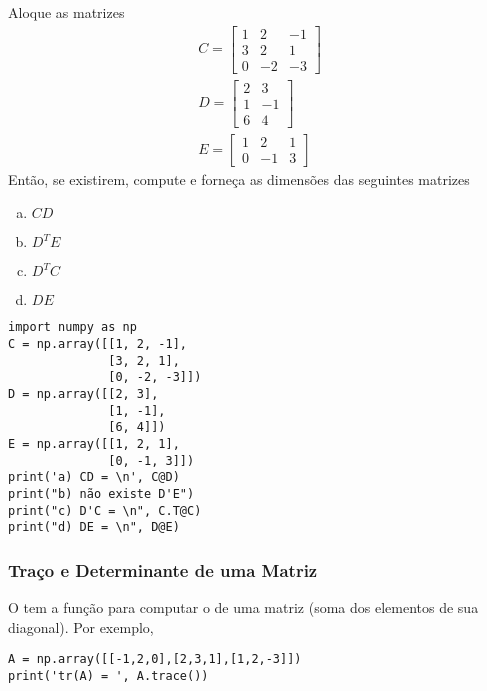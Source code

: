 \begin{exer}
  Aloque as matrizes
  \begin{gather}
    C =
    \begin{bmatrix}
      1 & 2 & -1 \\
      3 & 2 & 1 \\
      0 & -2 & -3
    \end{bmatrix}\\
    D =
    \begin{bmatrix}
      2 & 3 \\
      1 & -1 \\
      6 & 4
    \end{bmatrix}\\
    E =
    \begin{bmatrix}
      1 & 2 & 1 \\
      0 & -1 & 3
    \end{bmatrix}
  \end{gather}
  Então, se existirem, compute e forneça as dimensões das seguintes matrizes
  \begin{enumerate}[a)]
  \item $CD$
  \item $D^TE$
  \item $D^TC$
  \item $DE$
  \end{enumerate}
\end{exer}
\begin{resp}
  
\begin{lstlisting}
import numpy as np
C = np.array([[1, 2, -1],
              [3, 2, 1],
              [0, -2, -3]])
D = np.array([[2, 3],
              [1, -1],
              [6, 4]])
E = np.array([[1, 2, 1],
              [0, -1, 3]])
print('a) CD = \n', C@D)
print("b) não existe D'E")
print("c) D'C = \n", C.T@C)
print("d) DE = \n", D@E)
\end{lstlisting}

\end{resp}

\subsubsection{Traço e Determinante de uma Matriz}

O {\PYTHONnumpy} tem a função {\PYTHONnumpyDOTndarrayDOTtrace} para computar o  de uma matriz (soma dos elementos de sua diagonal). Por exemplo,

\begin{lstlisting}
A = np.array([[-1,2,0],[2,3,1],[1,2,-3]])
print('tr(A) = ', A.trace())
\end{lstlisting}

